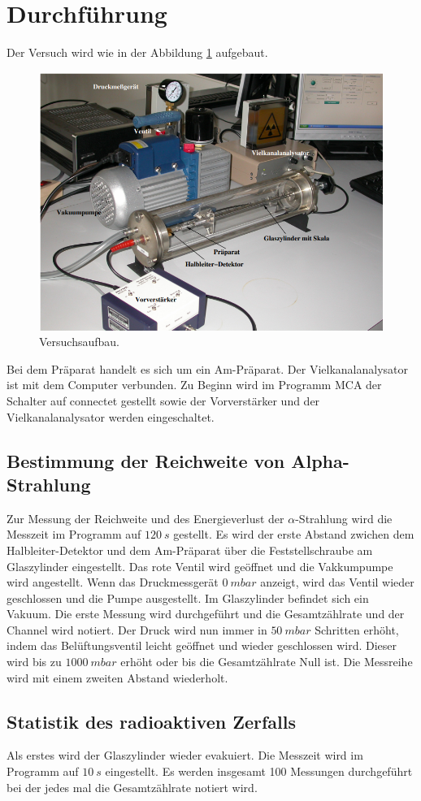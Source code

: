 \section{Durchführung}
\label{sec:Durchführung}
Der Versuch wird wie in der Abbildung \ref{fig:Aufbau} aufgebaut.
\begin{figure}
    \centering
    \includegraphics[scale=0.5]{content/Aufbau 701.png}
    \caption{Versuchsaufbau.}
    \label{fig:Aufbau}
\end{figure}
Bei dem Präparat handelt es sich um ein Am-Präparat. Der Vielkanalanalysator ist mit dem Computer verbunden.
Zu Beginn wird im Programm MCA der Schalter auf connectet gestellt sowie der Vorverstärker und der Vielkanalanalysator werden eingeschaltet.\\


\subsection{Bestimmung der Reichweite von Alpha-Strahlung}

\noindent Zur Messung der Reichweite und des Energieverlust der $\alpha$-Strahlung wird die Messzeit im Programm auf $\qty{120}{s}$ gestellt.
Es wird der erste Abstand zwichen dem Halbleiter-Detektor und dem Am-Präparat über die Feststellschraube am Glaszylinder eingestellt.
Das rote Ventil wird geöffnet und die Vakkumpumpe wird angestellt. 
Wenn das Druckmessgerät $\qty{0}{mbar}$ anzeigt, wird das Ventil wieder geschlossen und die Pumpe ausgestellt.
Im Glaszylinder befindet sich ein Vakuum.
Die erste Messung wird durchgeführt und die Gesamtzählrate und der Channel wird notiert.
Der Druck wird nun immer in $\qty{50}{mbar}$ Schritten erhöht, indem das Belüftungsventil leicht geöffnet und wieder geschlossen wird.
Dieser wird bis zu $\qty{1000}{mbar}$ erhöht oder bis die Gesamtzählrate Null ist.
Die Messreihe wird mit einem zweiten Abstand wiederholt.

\subsection{Statistik des radioaktiven Zerfalls}
Als erstes wird der Glaszylinder wieder evakuiert.
Die Messzeit wird im Programm auf $\qty{10}{s}$ eingestellt.
Es werden insgesamt 100 Messungen durchgeführt bei der jedes mal die Gesamtzählrate notiert wird.
